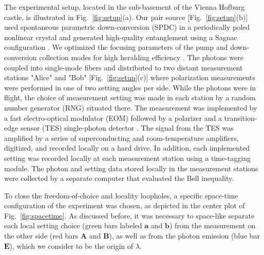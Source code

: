 \documentclass[superscriptaddress,twocolumn]{revtex4-1}
\begin{document}
The experimental setup, located in the sub-basement of the Vienna Hofburg castle, is illustrated in Fig.~\ref{fig:setup}(a). Our pair source [Fig.~\ref{fig:setup}(b)] used spontaneous parametric down-conversion (SPDC) in a periodically poled nonlinear crystal and generated high-quality entanglement using a Sagnac configuration \cite{fedrizzi2007}. We optimized the focusing parameters of the pump and down-conversion collection modes for high heralding efficiency \cite{Bennink2010,Steinlechner2015}. The photons were coupled into single-mode fibers and distributed to two distant measurement stations "Alice" and "Bob" [Fig.~\ref{fig:setup}(c)] where polarization measurements were performed in one of two setting angles per side. While the photons were in flight, the choice of measurement setting was made in each station by a random number generator (RNG) \cite{Abellan2014,Abellan2015} situated there. The measurement was implemented by a fast electro-optical modulator (EOM) followed by a polarizer and a transition-edge sensor (TES) single-photon detector \cite{Lita2008}. The signal from the TES was amplified by a series of superconducting \cite{Drung2007} and room-temperature amplifiers, digitized, and recorded locally on a hard drive. In addition, each implemented setting was recorded locally at each measurement station using a time-tagging module. The photon and setting data stored locally in the measurement stations were collected by a separate computer that evaluated the Bell inequality.

To close the freedom-of-choice and locality loopholes, a specific space-time configuration of the experiment was chosen, as depicted in the center plot of Fig.~\ref{fig:spacetime}. 
As discussed before, it was necessary to space-like separate each local setting choice  (green bars labeled $\textbf{a}$ and $\textbf{b}$) from the measurement on the other side (red bars $\textbf{A}$ and $\textbf{B}$), as well as from the photon emission (blue bar $\textbf{E}$),  which we consider to be the origin of $\lambda$.
\end{document}
